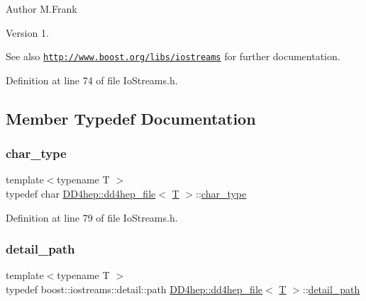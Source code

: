 \begin{DoxyAuthor}{Author}
M.\+Frank 
\end{DoxyAuthor}
\begin{DoxyVersion}{Version}
1.
\end{DoxyVersion}
\begin{DoxySeeAlso}{See also}
\href{http://www.boost.org/libs/iostreams}{\tt http\+://www.\+boost.\+org/libs/iostreams} for further documentation. 
\end{DoxySeeAlso}


Definition at line 74 of file Io\+Streams.\+h.



\subsection{Member Typedef Documentation}
\hypertarget{class_d_d4hep_1_1dd4hep__file_aef4242f7f2fe15a59f7bf7a8f6ba24d5}{}\label{class_d_d4hep_1_1dd4hep__file_aef4242f7f2fe15a59f7bf7a8f6ba24d5} 
\subsubsection{\texorpdfstring{char\+\_\+type}{char\_type}}
{\footnotesize\ttfamily template$<$typename T $>$ \\
typedef char \hyperlink{class_d_d4hep_1_1dd4hep__file}{D\+D4hep\+::dd4hep\+\_\+file}$<$ \hyperlink{class_t}{T} $>$\+::\hyperlink{class_d_d4hep_1_1dd4hep__file_aef4242f7f2fe15a59f7bf7a8f6ba24d5}{char\+\_\+type}}



Definition at line 79 of file Io\+Streams.\+h.

\hypertarget{class_d_d4hep_1_1dd4hep__file_a1dc19fee9af970892ad53dd7eadc5426}{}\label{class_d_d4hep_1_1dd4hep__file_a1dc19fee9af970892ad53dd7eadc5426} 
\subsubsection{\texorpdfstring{detail\+\_\+path}{detail\_path}}
{\footnotesize\ttfamily template$<$typename T $>$ \\
typedef boost\+::iostreams\+::detail\+::path \hyperlink{class_d_d4hep_1_1dd4hep__file}{D\+D4hep\+::dd4hep\+\_\+file}$<$ \hyperlink{class_t}{T} $>$\+::\hyperlink{class_d_d4hep_1_1dd4hep__file_a1dc19fee9af970892ad53dd7eadc5426}{detail\+\_\+path}}



